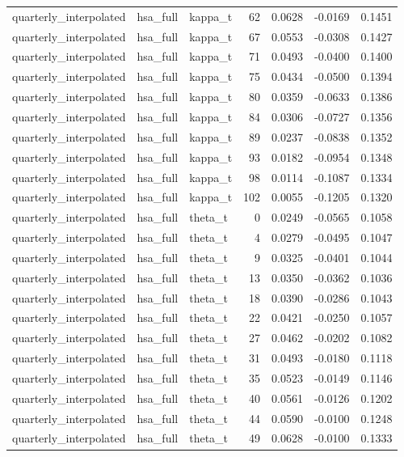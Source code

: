 \begin{tabular}{lllrrrr}
quarterly\_interpolated & hsa\_full & kappa\_t & 62 & 0.0628 & -0.0169 & 0.1451 \\
quarterly\_interpolated & hsa\_full & kappa\_t & 67 & 0.0553 & -0.0308 & 0.1427 \\
quarterly\_interpolated & hsa\_full & kappa\_t & 71 & 0.0493 & -0.0400 & 0.1400 \\
quarterly\_interpolated & hsa\_full & kappa\_t & 75 & 0.0434 & -0.0500 & 0.1394 \\
quarterly\_interpolated & hsa\_full & kappa\_t & 80 & 0.0359 & -0.0633 & 0.1386 \\
quarterly\_interpolated & hsa\_full & kappa\_t & 84 & 0.0306 & -0.0727 & 0.1356 \\
quarterly\_interpolated & hsa\_full & kappa\_t & 89 & 0.0237 & -0.0838 & 0.1352 \\
quarterly\_interpolated & hsa\_full & kappa\_t & 93 & 0.0182 & -0.0954 & 0.1348 \\
quarterly\_interpolated & hsa\_full & kappa\_t & 98 & 0.0114 & -0.1087 & 0.1334 \\
quarterly\_interpolated & hsa\_full & kappa\_t & 102 & 0.0055 & -0.1205 & 0.1320 \\
quarterly\_interpolated & hsa\_full & theta\_t & 0 & 0.0249 & -0.0565 & 0.1058 \\
quarterly\_interpolated & hsa\_full & theta\_t & 4 & 0.0279 & -0.0495 & 0.1047 \\
quarterly\_interpolated & hsa\_full & theta\_t & 9 & 0.0325 & -0.0401 & 0.1044 \\
quarterly\_interpolated & hsa\_full & theta\_t & 13 & 0.0350 & -0.0362 & 0.1036 \\
quarterly\_interpolated & hsa\_full & theta\_t & 18 & 0.0390 & -0.0286 & 0.1043 \\
quarterly\_interpolated & hsa\_full & theta\_t & 22 & 0.0421 & -0.0250 & 0.1057 \\
quarterly\_interpolated & hsa\_full & theta\_t & 27 & 0.0462 & -0.0202 & 0.1082 \\
quarterly\_interpolated & hsa\_full & theta\_t & 31 & 0.0493 & -0.0180 & 0.1118 \\
quarterly\_interpolated & hsa\_full & theta\_t & 35 & 0.0523 & -0.0149 & 0.1146 \\
quarterly\_interpolated & hsa\_full & theta\_t & 40 & 0.0561 & -0.0126 & 0.1202 \\
quarterly\_interpolated & hsa\_full & theta\_t & 44 & 0.0590 & -0.0100 & 0.1248 \\
quarterly\_interpolated & hsa\_full & theta\_t & 49 & 0.0628 & -0.0100 & 0.1333 \\

\end{tabular}

